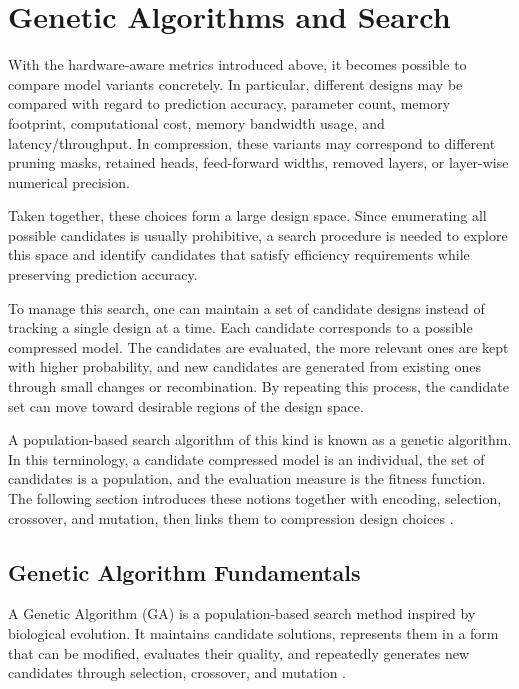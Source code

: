\section{Genetic Algorithms and Search}
\label{sec:genetic_algorithms_pruning_only}

With the hardware-aware metrics introduced above, it becomes possible to compare model variants concretely. In particular, different designs may be compared with regard to prediction accuracy, parameter count, memory footprint, computational cost, memory bandwidth usage, and latency/throughput. In compression, these variants may correspond to different pruning masks, retained heads, feed-forward widths, removed layers, or layer-wise numerical precision.

Taken together, these choices form a large design space. Since enumerating all possible candidates is usually prohibitive, a search procedure is needed to explore this space and identify candidates that satisfy efficiency requirements while preserving prediction accuracy.

To manage this search, one can maintain a set of candidate designs instead of tracking a single design at a time. Each candidate corresponds to a possible compressed model. The candidates are evaluated, the more relevant ones are kept with higher probability, and new candidates are generated from existing ones through small changes or recombination. By repeating this process, the candidate set can move toward desirable regions of the design space.

A population-based search algorithm of this kind is known as a genetic algorithm. In this terminology, a candidate compressed model is an individual, the set of candidates is a population, and the evaluation measure is the fitness function. The following section introduces these notions together with encoding, selection, crossover, and mutation, then links them to compression design choices \cite{holland1975adaptation,goldberg1989genetic,deb2001multi}.

\subsection{Genetic Algorithm Fundamentals}

A Genetic Algorithm (GA) is a population-based search method inspired by biological evolution. It maintains candidate solutions, represents them in a form that can be modified, evaluates their quality, and repeatedly generates new candidates through selection, crossover, and mutation \cite{holland1975adaptation,goldberg1989genetic,michalewicz1996genetic}.

